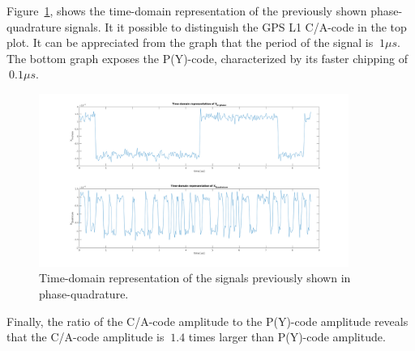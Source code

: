 Figure~\ref{fig:ex7_time_domain}, shows the time-domain representation of the
previously shown phase-quadrature signals. It it possible to distinguish the
GPS L1 C/A-code in the top plot. It can be appreciated from the graph that the
period of the signal is $~1 \mu s$. The bottom graph exposes the P(Y)-code,
characterized by its faster chipping of $~0.1 \mu s$.

\begin{figure}[H]
	\centering
	\includegraphics[width=0.9\textwidth]{figs/ex7_time_domain.png}
	\caption{Time-domain representation of the signals previously shown in
		phase-quadrature.}
	\label{fig:ex7_time_domain}
\end{figure}

Finally, the ratio of the C/A-code amplitude to the P(Y)-code amplitude reveals
that the C/A-code amplitude is $~1.4$ times larger than P(Y)-code amplitude.

